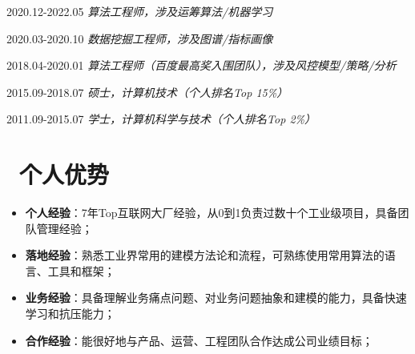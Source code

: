 \documentclass{resume}
\begin{document}
                                                  {2020.12-2022.05}
   \faUserMd   \textit{   算法工程师，涉及运筹算法/机器学习 }

                                  {2020.03-2020.10}
   \faUserMd   \textit{   数据挖掘工程师，涉及图谱/指标画像 }

                                 {2018.04-2020.01}
   \faUserMd   \textit{   算法工程师（百度最高奖入围团队），涉及风控模型/策略/分析 }

                                              {2015.09-2018.07}
   \faGraduationCap   \textit{  硕士，计算机技术（个人排名Top 15\%） }

                                  {2011.09-2015.07}
   \faGraduationCap   \textit{  学士，计算机科学与技术（个人排名Top 2\%）}

\medskip










\section{   \faFlag    \  个人优势}

\begin{itemize}  [parsep=0.5ex]
   \item  \textbf{个人经验}：7年Top互联网大厂经验，从0到1负责过数十个工业级项目，具备团队管理经验；

   \item   \textbf{落地经验}：熟悉工业界常用的建模方法论和流程，可熟练使用常用算法的语言、工具和框架；
   
   \item  \textbf{业务经验}：具备理解业务痛点问题、对业务问题抽象和建模的能力，具备快速学习和抗压能力；
  
  \item \textbf{合作经验}：能很好地与产品、运营、工程团队合作达成公司业绩目标；
  
 
\end{itemize}

\medskip
\end{document}
